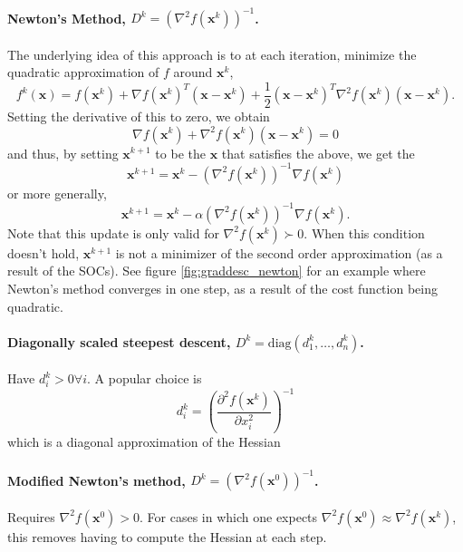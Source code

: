 \paragraph{Newton's Method, $D^k = (\nabla^2 f(\bm{x}^k))^{-1}$.} The underlying idea of this approach is to at each iteration, minimize the quadratic approximation of $f$ around $\bm{x}^k$,
\begin{equation}
    f^k(\bm{x}) = f(\bm{x}^k) + \nabla f(\bm{x}^k)^T (\bm{x} - \bm{x}^k) + \frac{1}{2} (\bm{x} - \bm{x}^k)^T \nabla^2 f(\bm{x}^k) (\bm{x} - \bm{x}^k).
\end{equation}
Setting the derivative of this to zero, we obtain 
\begin{equation}
    \nabla f(\bm{x}^k) + \nabla^2 f(\bm{x}^k) (\bm{x} - \bm{x}^k) = 0
\end{equation}
and thus, by setting $\bm{x}^{k+1}$ to be the $\bm{x}$ that satisfies the above, we get the
\begin{equation}
    \bm{x}^{k+1} = \bm{x}^k - (\nabla^2 f(\bm{x}^k))^{-1} \nabla f(\bm{x}^k)
\end{equation}
or more generally, 
\begin{equation}
    \bm{x}^{k+1} = \bm{x}^k - \alpha (\nabla^2 f(\bm{x}^k))^{-1} \nabla f(\bm{x}^k).
\end{equation}
Note that this update is only valid for $\nabla^2 f(\bm{x}^k) \succ 0$. When this condition doesn't hold, $\bm{x}^{k+1}$ is not a minimizer of the second order approximation (as a result of the SOCs). See figure \ref{fig:graddesc_newton} for an example where Newton's method converges in one step, as a result of the cost function being quadratic. 

\paragraph{Diagonally scaled steepest descent, $D^k = \textrm{diag}(d_1^k, \ldots, d_n^k)$.} Have $d_i^k >0 \forall i$. A popular choice is 
\begin{equation}
    d_i^k = \left( \frac{\partial^2 f(\bm{x}^k)}{\partial x_i^2} \right)^{-1}
\end{equation}
which is a diagonal approximation of the Hessian


\paragraph{Modified Newton's method, $D^k = (\nabla^2 f(\bm{x}^0))^{-1}$.} Requires $\nabla^2 f(\bm{x}^0) > 0$. For cases in which one expects $\nabla^2 f(\bm{x}^0) \approx \nabla^2 f(\bm{x}^k)$, this removes having to compute the Hessian at each step. 

